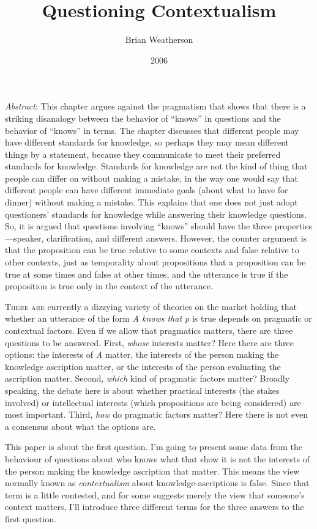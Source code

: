 \documentclass[
  11pt,
  letterpaper,
  DIV=11,
  numbers=noendperiod,
  twoside]{scrartcl}
\title{Questioning Contextualism}
\author{Brian Weatherson}
\date{2006}
\renewenvironment{abstract}
 {\vspace{-1.25cm}
 \quotation\small\noindent\emph{Abstract}:}
 {\endquotation}
\renewenvironment{abstract}
 {\quotation\small\noindent\emph{Abstract}:}
 {\endquotation\vspace{-0.02cm}}
\begin{document}
\maketitle
\begin{abstract}
This chapter argues against the pragmatism that shows that there is a
striking disanalogy between the behavior of ``knows'' in questions and
the behavior of ``knows'' in terms. The chapter discusses that different
people may have different standards for knowledge, so perhaps they may
mean different things by a statement, because they communicate to meet
their preferred standards for knowledge. Standards for knowledge are not
the kind of thing that people can differ on without making a mistake, in
the way one would say that different people can have different immediate
goals (about what to have for dinner) without making a mistake. This
explains that one does not just adopt questioners' standards for
knowledge while answering their knowledge questions. So, it is argued
that questions involving ``knows'' should have the three
properties---speaker, clarification, and different answers. However, the
counter argument is that the proposition can be true relative to some
contexts and false relative to other contexts, just as temporality about
propositions that a proposition can be true at some times and false at
other times, and the utterance is true if the proposition is true only
in the context of the utterance.
\end{abstract}


\lettrine{T}{here are} currently a dizzying variety of theories on the
market holding that whether an utterance of the form \emph{A knows that
p} is true depends on pragmatic or contextual factors. Even if we allow
that pragmatics matters, there are three questions to be answered.
First, \emph{whose} interests matter? Here there are three options: the
interests of \emph{A} matter, the interests of the person making the
knowledge ascription matter, or the interests of the person evaluating
the ascription matter. Second, \emph{which} kind of pragmatic factors
matter? Broadly speaking, the debate here is about whether practical
interests (the stakes involved) or intellectual interests (which
propositions are being considered) are most important. Third, \emph{how}
do pragmatic factors matter? Here there is not even a consensus about
what the options are.

This paper is about the first question. I'm going to present some data
from the behaviour of questions about who knows what that show it is not
the interests of the person making the knowledge ascription that matter.
This means the view normally known as \emph{contextualism} about
knowledge-ascriptions is false. Since that term is a little contested,
and for some suggests merely the view that someone's context matters,
I'll introduce three different terms for the three answers to the first
question.
\end{document}
